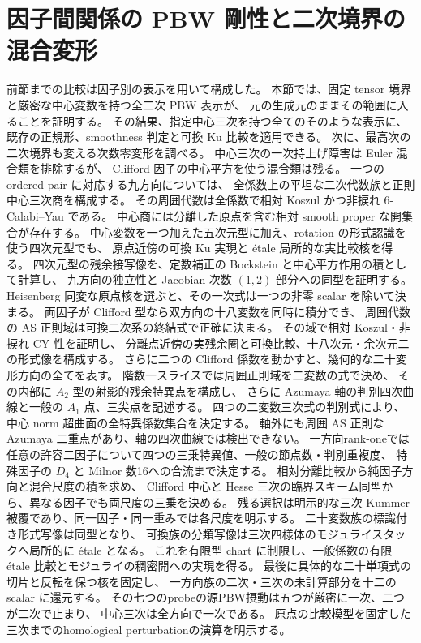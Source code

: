 \section{因子間関係の PBW 剛性と二次境界の混合変形}
\label{ifd:sec:interfactor}

前節までの比較は因子別の表示を用いて構成した。
本節では、固定 tensor 境界と厳密な中心変数を持つ全二次 PBW 表示が、
元の生成元のままその範囲に入ることを証明する。
その結果、指定中心三次を持つ全てのそのような表示に、
既存の正規形、smoothness 判定と可換 Ku 比較を適用できる。
次に、最高次の二次境界も変える次数零変形を調べる。
中心三次の一次持上げ障害は Euler 混合類を排除するが、
Clifford 因子の中心平方を使う混合類は残る。
一つの ordered pair に対応する九方向については、
全係数上の平坦な二次代数族と正則中心三次商を構成する。
その周囲代数は全係数で相対 Koszul かつ非捩れ $6$-Calabi--Yau である。
中心商には分離した原点を含む相対 smooth proper な開集合が存在する。
中心変数を一つ加えた五次元型に加え、rotation の形式認識を使う四次元型でも、
原点近傍の可換 Ku 実現と \'etale 局所的な実比較核を得る。
四次元型の残余接写像を、定数補正の Bockstein と中心平方作用の積として計算し、
九方向の独立性と Jacobian 次数 $(1,2)$ 部分への同型を証明する。
Heisenberg 同変な原点核を選ぶと、その一次式は一つの非零 scalar を除いて決まる。
両因子が Clifford 型なら双方向の十八変数を同時に積分でき、
周囲代数の AS 正則域は可換二次系の終結式で正確に決まる。
その域で相対 Koszul・非捩れ CY 性を証明し、
分離点近傍の実残余圏と可換比較、十八次元・余次元二の形式像を構成する。
さらに二つの Clifford 係数を動かすと、幾何的な二十変形方向の全てを表す。
階数一スライスでは周囲正則域を二変数の式で決め、
その内部に $A_2$ 型の射影的残余特異点を構成し、
さらに Azumaya 軸の判別四次曲線と一般の $A_1$ 点、三尖点を記述する。
四つの二変数三次式の判別式により、中心 norm 超曲面の全特異係数集合を決定する。
軸外にも周囲 AS 正則な Azumaya 二重点があり、軸の四次曲線では検出できない。
一方向rank-oneでは任意の許容二因子について四つの三乗特異値、一般の節点数・判別重複度、
特殊因子の $D_4$ と Milnor 数16への合流まで決定する。
相対分離比較から純因子方向と混合尺度の積を求め、
Clifford 中心と Hesse 三次の臨界スキーム同型から、異なる因子でも両尺度の三乗を決める。
残る選択は明示的な三次 Kummer 被覆であり、同一因子・同一重みでは各尺度を明示する。
二十変数族の標識付き形式写像は同型となり、
可換族の分類写像は三次四様体のモジュライスタックへ局所的に \'etale となる。
これを有限型 chart に制限し、一般係数の有限 \'etale 比較とモジュライの稠密開への実現を得る。
最後に具体的な二十単項式の切片と反転を保つ核を固定し、
一方向族の二次・三次の未計算部分を十二の scalar に還元する。
その七つのprobeの源PBW摂動は五つが厳密に一次、二つが二次で止まり、
中心三次は全方向で一次である。
原点の比較模型を固定した三次までのhomological perturbationの演算を明示する。

